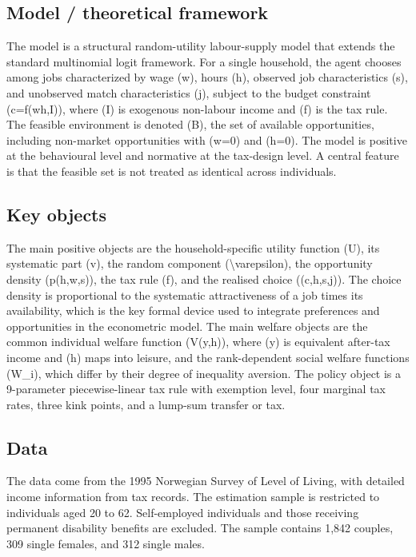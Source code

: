 \documentclass[11pt,a4paper]{article}
\begin{document}
\subsection*{Model / theoretical framework}
The model is a structural random-utility labour-supply model that extends the standard multinomial logit framework. For a single household, the agent chooses among jobs characterized by wage (w), hours (h), observed job characteristics (s), and unobserved match characteristics (j), subject to the budget constraint (c=f(wh,I)), where (I) is exogenous non-labour income and (f) is the tax rule. The feasible environment is denoted (B), the set of available opportunities, including non-market opportunities with (w=0) and (h=0). The model is positive at the behavioural level and normative at the tax-design level. A central feature is that the feasible set is not treated as identical across individuals.

\subsection*{Key objects}
The main positive objects are the household-specific utility function (U), its systematic part (v), the random component (\textbackslash{}varepsilon), the opportunity density (p(h,w,s)), the tax rule (f), and the realised choice ((c,h,s,j)). The choice density is proportional to the systematic attractiveness of a job times its availability, which is the key formal device used to integrate preferences and opportunities in the econometric model. The main welfare objects are the common individual welfare function (V(y,h)), where (y) is equivalent after-tax income and (h) maps into leisure, and the rank-dependent social welfare functions (W\_i), which differ by their degree of inequality aversion. The policy object is a 9-parameter piecewise-linear tax rule with exemption level, four marginal tax rates, three kink points, and a lump-sum transfer or tax.

\subsection*{Data}
The data come from the 1995 Norwegian Survey of Level of Living, with detailed income information from tax records. The estimation sample is restricted to individuals aged 20 to 62. Self-employed individuals and those receiving permanent disability benefits are excluded. The sample contains 1,842 couples, 309 single females, and 312 single males.
\end{document}

